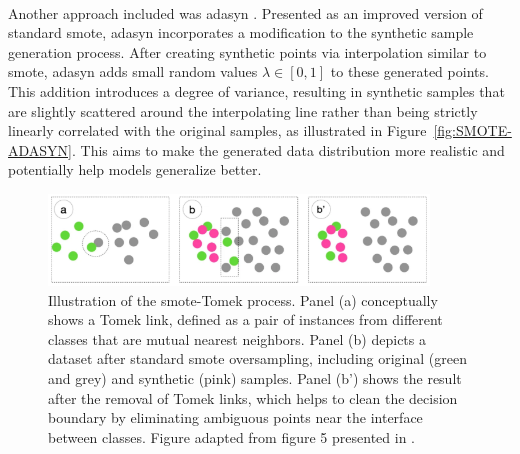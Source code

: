 \documentclass[12pt,a4paper]{report}
\begin{document}
\\
\noindent
Another approach included was \gls{adasyn} \cite{He2008ADASYN}. Presented as an improved version of standard \gls{smote}, \gls{adasyn} incorporates a modification to the synthetic sample generation process. After creating synthetic points via interpolation similar to \gls{smote}, \gls{adasyn} adds small random values $\lambda \in [0, 1]$ to these generated points. This addition introduces a degree of variance, resulting in synthetic samples that are slightly scattered around the interpolating line rather than being strictly linearly correlated with the original samples, as illustrated in Figure~\ref{fig:SMOTE-ADASYN}. This aims to make the generated data distribution more realistic and potentially help models generalize better.\\
\begin{figure}[h!]
  \centering
  \includegraphics[width=0.9\textwidth]{images/SMOTE-Tomek.png}
  \caption[Illustration of \gls{smote}-Tomek Process]{Illustration of the \gls{smote}-Tomek process. Panel (a) conceptually shows a Tomek link, defined as a pair of instances from different classes that are mutual nearest neighbors. Panel (b) depicts a dataset after standard \gls{smote} oversampling, including original (green and grey) and synthetic (pink) samples. Panel (b') shows the result after the removal of Tomek links, which helps to clean the decision boundary by eliminating ambiguous points near the interface between classes. Figure adapted from figure 5 presented in \cite{Truong2022SMOTEVariants}.}
  \label{fig:SMOTE-Tomek} %
\end{figure}
\\
\noindent
\end{document}
